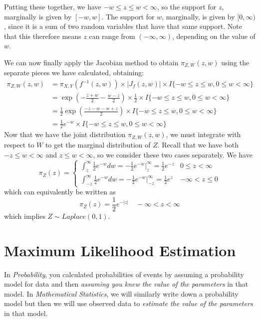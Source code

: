 \documentclass[
  letterpaper,
  DIV=11,
  numbers=noendperiod]{scrreprt}
\begin{document}
Putting these together, we have \(-w \leq z \leq w < \infty\), so the
support for \(z\), marginally is given by \([-w, w]\). The support for
\(w\), marginally, is given by \([0, \infty)\), since it is a sum of two
random variables that have that same support. Note that this therefore
means \(z\) can range from \((-\infty, \infty)\), depending on the value
of \(w\).

We can now finally apply the Jacobian method to obtain
\(\pi_{Z,W}(z,w)\) using the separate pieces we have calculated,
obtaining: \begin{align*}
    \pi_{Z,W}(z,w) & = \pi_{X,Y}(f^{-1}(z,w)) \times | J_f(z,w) |  \times I \{ -w \leq z \leq w, 0 \leq w < \infty \}\\
    & = \exp(-\frac{z + w}{2} - \frac{w-z}{2}) \times \frac{1}{2} \times I \{ -w \leq z \leq w, 0 \leq w < \infty \}\\
    & = \frac{1}{2} \exp(\frac{-z - w - w + z}{2}) \times I \{ -w \leq z \leq w, 0 \leq w < \infty \}\\
    & = \frac{1}{2} e^{-w} \times I \{ -w \leq z \leq w, 0 \leq w < \infty \}
\end{align*} Now that we have the joint distribution \(\pi_{Z,W}(z,w)\),
we must integrate with respect to \(W\) to get the marginal distribution
of \(Z\). Recall that we have both \(-z \leq w < \infty\) and
\(z \leq w < \infty\), so we consider these two cases separately. We
have \[
\pi_Z(z) = \begin{cases}
    \int_z^\infty \frac{1}{2} e^{-w} dw = - \frac{1}{2} e^{-w} \big|_z^\infty = \frac{1}{2}e^{-z} & 0 \leq z < \infty\\
    \int_{-z}^\infty \frac{1}{2} e^{-w} dw = - \frac{1}{2} e^{-w} \big|_{-z}^\infty = \frac{1}{2}e^{z} & -\infty < z \leq 0
\end{cases}
\] which can equivalently be written as \[
\pi_Z(z) = \frac{1}{2} e^{-|z|} \quad -\infty < z < \infty
\] which implies \(Z \sim Laplace(0,1)\).


\chapter{Maximum Likelihood
Estimation}\label{maximum-likelihood-estimation}

In \emph{Probability}, you calculated probabilities of events by
assuming a probability model for data and then \emph{assuming you knew
the value of the parameters} in that model. In \emph{Mathematical
Statistics}, we will similarly write down a probability model but then
we will use observed data to \emph{estimate the value of the parameters}
in that model.
\end{document}
